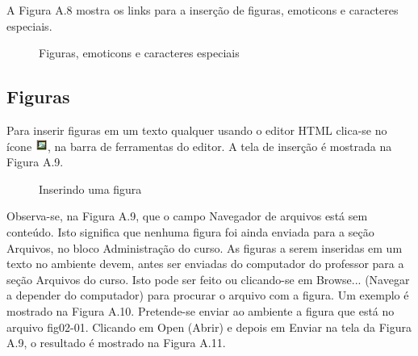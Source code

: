 
A Figura A.8 mostra os links para a inserção de figuras, emoticons e caracteres especiais.

\begin{figure}
 \begin{center}
  \caption{Figuras, emoticons e caracteres especiais}
 \end{center}
\end{figure}

\subsection{Figuras}

Para inserir figuras em um texto qualquer usando o editor HTML clica-se no ícone 
\includegraphics[width=0.4cm]{imagem/cap0/image.jpg}, na barra de ferramentas do editor. A tela de inserção é mostrada na Figura A.9.

\begin{figure}
 \begin{center}
  \caption{Inserindo uma figura}
 \end{center}
\end{figure}

Observa-se, na Figura A.9, que o campo Navegador de arquivos está sem conteúdo. Isto significa que nenhuma figura foi ainda enviada para a seção Arquivos, no bloco Administração do curso. As figuras a serem inseridas em um texto no ambiente devem, antes ser enviadas do computador do professor para a seção Arquivos do curso. Isto pode ser feito ou clicando-se em Browse... (Navegar a depender do computador) para procurar o arquivo com a figura. Um exemplo é mostrado na Figura A.10. Pretende-se enviar ao ambiente a figura que está no arquivo fig02-01. Clicando em Open (Abrir) e depois em Enviar na tela da Figura A.9, o resultado é mostrado na Figura A.11.

